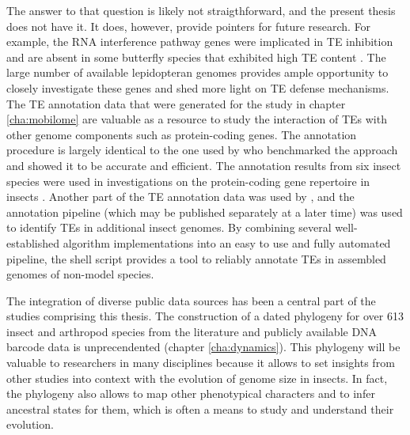 The answer to that question is likely not straigthforward, and the
present thesis does not have it. It does, however, provide pointers for
future research. For example, the RNA interference pathway genes were
implicated in TE inhibition \citep{Aravin2001,Czech2008} and are absent
in some butterfly species that exhibited high TE content
\citep{Dowling2017}.  The large number of available lepidopteran genomes
provides ample opportunity to closely investigate these genes and shed
more light on TE defense mechanisms.  The TE annotation data that were
generated for the study in chapter \ref{cha:mobilome} are valuable as a
resource to study the interaction of TEs with other genome components
such as protein-coding genes. The annotation procedure is largely
identical to the one used by \citet{Reinar2016} who benchmarked the
approach and showed it to be accurate and efficient. The annotation
results from six insect species  were
used in investigations on the protein-coding gene repertoire in insects
. Another part of the TE annotation data was
used by \citep{Provataris2018}, and the annotation pipeline (which may
be published separately at a later time) was used to identify TEs in
additional insect genomes. By combining several well-established
algorithm implementations into an easy to use and fully automated
pipeline, the shell script provides a tool to reliably annotate TEs in
assembled genomes of non-model species. 

The integration of diverse public data sources has been a central part
of the studies comprising this thesis. The construction of a dated
phylogeny for over 613 insect and arthropod species from the literature
and publicly available DNA barcode data is unprecendented (chapter
\ref{cha:dynamics}). This phylogeny will be valuable to researchers in
many disciplines because it allows to set insights from other studies
into context with the evolution of genome size in insects.  In fact, the
phylogeny also allows to map other phenotypical characters and to infer
ancestral states for them, which is often a means to study and
understand their evolution.

